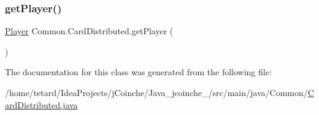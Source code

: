 \subsubsection{\texorpdfstring{get\+Player()}{getPlayer()}}
{\footnotesize\ttfamily \mbox{\hyperlink{classCommon_1_1Player}{Player}} Common.\+Card\+Distributed.\+get\+Player (\begin{DoxyParamCaption}{ }\end{DoxyParamCaption})\hspace{0.3cm}{\ttfamily [inline]}}



The documentation for this class was generated from the following file\+:\begin{DoxyCompactItemize}
\item 
/home/tetard/\+Idea\+Projects/j\+Coinche/\+Java\+\_\+jcoinche\+\_/src/main/java/\+Common/\mbox{\hyperlink{CardDistributed_8java}{Card\+Distributed.\+java}}\end{DoxyCompactItemize}
